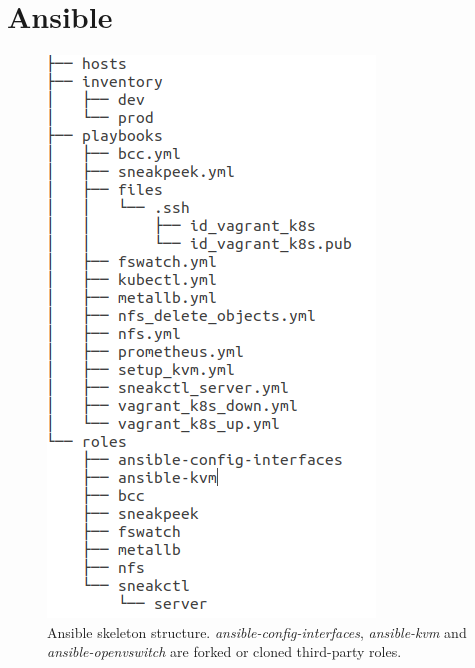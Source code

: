 \setcounter{figure}{0}
\setcounter{listing}{0}
\appendixpagenumbering

\chapter{Ansible \label{appendix:ansible}}

\begin{figure}[h]
	\centering
	\includegraphics[scale=0.47]{assets/appendices/ansible_tree}
	\caption{Ansible skeleton structure. \textit{ansible-config-interfaces}, \textit{ansible-kvm} and \textit{ansible-openvswitch} are forked or cloned third-party roles.}
	\label{appendix:ansible:structure}
\end{figure}

